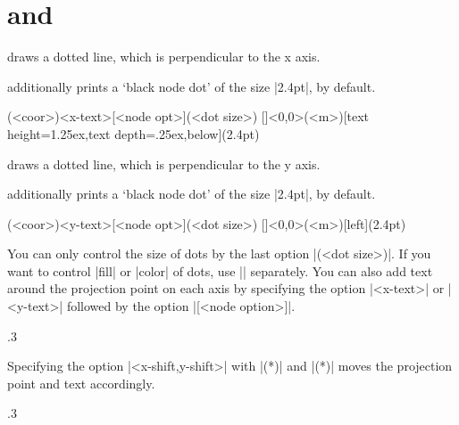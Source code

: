 \section{\protect\cmd{\tzprojx(*)} and \protect\cmd{\tzprojy(*)}}
\label{s:tzprojx}

\icmd{\tzprojx} draws a dotted line, which is perpendicular to the x axis.

\icmd{\tzprojx*} additionally prints a `black node dot' of the size |2.4pt|, by default.


\begin{tzdef}{}
(<coor>){<x-text>}[<node opt>](<dot size>)
  []<0,0>(<m>){}[text height=1.25ex,text depth=.25ex,below](2.4pt)
\end{tzdef}


\icmd{\tzprojy} draws a dotted line, which is perpendicular to the y axis.

\icmd{\tzprojy*} additionally prints a `black node dot' of the size |2.4pt|, by default.

\begin{tzdef}{}
(<coor>){<y-text>}[<node opt>](<dot size>)
  []<0,0>(<m>){}[left](2.4pt)
\end{tzdef}


You can only control the size of dots by the last option |(<dot size>)|.
If you want to control |fill| or |color| of dots, use |\tzdot*| separately.
You can also add text around the projection point on each axis by specifying the option |{<x-text>}| or |{<y-text>}| followed by the option |[<node option>]|.

\begin{tzcode}{.3}
\end{tzcode}

Specifying the option |<x-shift,y-shift>| with |\tzprojx(*)| and |\tzprojy(*)| moves the projection point and text accordingly.

\begin{tzcode}{.3}
\end{tzcode}



